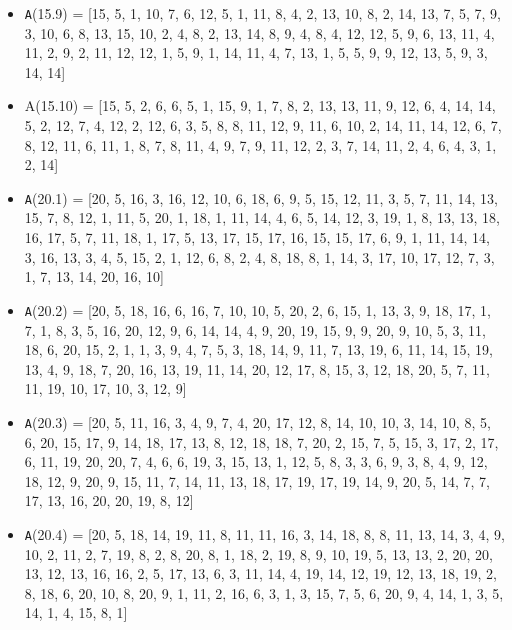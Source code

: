 \documentclass[runningheads, a4paper]{llncs}
\begin{document}
\begin{itemize}
	\item {\texttt A(15.9) = } [15, 5, 1, 10, 7, 6, 12, 5, 1, 11, 8, 4, 2, 13, 10, 8, 2, 14, 13, 7, 5, 7, 9, 3, 10, 6, 8, 13, 15, 10, 2, 4, 8, 2, 13, 14, 8, 9, 4, 8, 4, 12, 12, 5, 9, 6, 13, 11, 4, 11, 2, 9, 2, 11, 12, 12, 1, 5, 9, 1, 14, 11, 4, 7, 13, 1, 5, 5, 9, 9, 12, 13, 5, 9, 3, 14, 14]
	\item  A(15.10) =  [15, 5, 2, 6, 6, 5, 1, 15, 9, 1, 7, 8, 2, 13, 13, 11, 9, 12, 6, 4, 14, 14, 5, 2, 12, 7, 4, 12, 2, 12, 6, 3, 5, 8, 8, 11, 12, 9, 11, 6, 10, 2, 14, 11, 14, 12, 6, 7, 8, 12, 11, 6, 11, 1, 8, 7, 8, 11, 4, 9, 7, 9, 11, 12, 2, 3, 7, 14, 11, 2, 4, 6, 4, 3, 1, 2, 14]

\end{itemize}


\begin{itemize}
	\item {\texttt A(20.1) = } [20, 5, 16, 3, 16, 12, 10, 6, 18, 6, 9, 5, 15, 12, 11, 3, 5, 7, 11, 14, 13, 15, 7, 8, 12, 1, 11, 5, 20, 1, 18, 1, 11, 14, 4, 6, 5, 14, 12, 3, 19, 1, 8, 13, 13, 18, 16, 17, 5, 7, 11, 18, 1, 17, 5, 13, 17, 15, 17, 16, 15, 15, 17, 6, 9, 1, 11, 14, 14, 3, 16, 13, 3, 4, 5, 15, 2, 1, 12, 6, 8, 2, 4, 8, 18, 8, 1, 14, 3, 17, 10, 17, 12, 7, 3, 1, 7, 13, 14, 20, 16, 10]

	\item {\texttt A(20.2) = } [20, 5, 18, 16, 6, 16, 7, 10, 10, 5, 20, 2, 6, 15, 1, 13, 3, 9, 18, 17, 1, 7, 1, 8, 3, 5, 16, 20, 12, 9, 6, 14, 14, 4, 9, 20, 19, 15, 9, 9, 20, 9, 10, 5, 3, 11, 18, 6, 20, 15, 2, 1, 1, 3, 9, 4, 7, 5, 3, 18, 14, 9, 11, 7, 13, 19, 6, 11, 14, 15, 19, 13, 4, 9, 18, 7, 20, 16, 13, 19, 11, 14, 20, 12, 17, 8, 15, 3, 12, 18, 20, 5, 7, 11, 11, 19, 10, 17, 10, 3, 12, 9]
	
	\item {\texttt A(20.3) = } [20, 5, 11, 16, 3, 4, 9, 7, 4, 20, 17, 12, 8, 14, 10, 10, 3, 14, 10, 8, 5, 6, 20, 15, 17, 9, 14, 18, 17, 13, 8, 12, 18, 18, 7, 20, 2, 15, 7, 5, 15, 3, 17, 2, 17, 6, 11, 19, 20, 20, 7, 4, 6, 6, 19, 3, 15, 13, 1, 12, 5, 8, 3, 3, 6, 9, 3, 8, 4, 9, 12, 18, 12, 9, 20, 9, 15, 11, 7, 14, 11, 13, 18, 17, 19, 17, 19, 14, 9, 20, 5, 14, 7, 7, 17, 13, 16, 20, 20, 19, 8, 12]
	
	\item {\texttt A(20.4) = } [20, 5, 18, 14, 19, 11, 8, 11, 11, 16, 3, 14, 18, 8, 8, 11, 13, 14, 3, 4, 9, 10, 2, 11, 2, 7, 19, 8, 2, 8, 20, 8, 1, 18, 2, 19, 8, 9, 10, 19, 5, 13, 13, 2, 20, 20, 13, 12, 13, 16, 16, 2, 5, 17, 13, 6, 3, 11, 14, 4, 19, 14, 12, 19, 12, 13, 18, 19, 2, 8, 18, 6, 20, 10, 8, 20, 9, 1, 11, 2, 16, 6, 3, 1, 3, 15, 7, 5, 6, 20, 9, 4, 14, 1, 3, 5, 14, 1, 4, 15, 8, 1]
	

\end{itemize}
\end{document}
